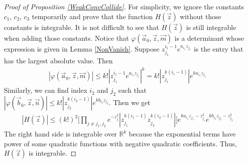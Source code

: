 \begin{proof}[Proof of Proposition \ref{WeakConvCollide}]
For simplicity, we ignore the constants $c_{1}$, $c_{2}$, $c_{3}$ temporarily and prove that the function $H(\vec{z})$ without those constants is integrable. It is not difficult to see that $H(\vec{z})$ is still integrable when adding those constants. Notice that $\varphi(\vec{a}_{0},\vec{z},\vec{m})$ is a determinant whose expression is given in Lemma \ref{NonVanish}. Suppose $z_{j_1}^{i_1-1}e^{a_{i_1}z_{j_1}}$ is the entry that has the largest absolute value. Then 
\begin{align*}
	|\varphi(\vec{a}_{0},\vec{z},\vec{m})|\leqslant k!|z_{j_{1}}^{i_{1}-1}e^{a_{i_1}z_{j_1}}|^{k}=k!|z_{j_1}^{k(i_1-1)}|e^{ka_{i_1}z_{j_1}}
\end{align*}
Similarly, we can find index $i_2$ and $j_{2}$ such that $|\varphi(\vec{b}_{0},\vec{z},\vec{n})|\leqslant k!|z_{j_2}^{k(i_2-1)}|e^{kb_{i_2}z_{j_2}}$. Then we get 
\begin{align*}
	|H(\vec{z})|\leqslant (k!)^{2}\big[\prod_{j\neq j_1,j_2}e^{-z_{j}^{2}}|z_{j_1}^{k(i_1-1)}z_{j_2}^{k(i_2-1)}|\big]e^{ka_{i_1}z_{j_1}-z_{j_1}^2}e^{kb_{i_2}z_{j_2}-z_{j_2}^{2}}
\end{align*}
The right hand side is integrable over $\mathbb{R}^{k}$ because the exponential terms have power of some quadratic functions with negative quadratic coefficients. Thus, $H(\vec{z})$ is integrable.


\end{proof}
